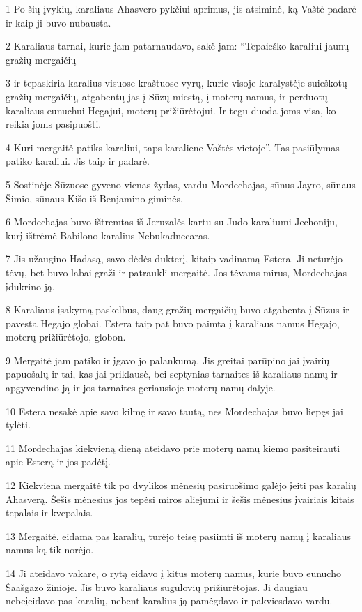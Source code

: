 \par 1 Po šių įvykių, karaliaus Ahasvero pykčiui aprimus, jis atsiminė, ką Vaštė padarė ir kaip ji buvo nubausta. 
\par 2 Karaliaus tarnai, kurie jam patarnaudavo, sakė jam: “Tepaieško karaliui jaunų gražių mergaičių 
\par 3 ir tepaskiria karalius visuose kraštuose vyrų, kurie visoje karalystėje suieškotų gražių mergaičių, atgabentų jas į Sūzų miestą, į moterų namus, ir perduotų karaliaus eunuchui Hegajui, moterų prižiūrėtojui. Ir tegu duoda joms visa, ko reikia joms pasipuošti. 
\par 4 Kuri mergaitė patiks karaliui, taps karaliene Vaštės vietoje”. Tas pasiūlymas patiko karaliui. Jis taip ir padarė. 
\par 5 Sostinėje Sūzuose gyveno vienas žydas, vardu Mordechajas, sūnus Jayro, sūnaus Šimio, sūnaus Kišo iš Benjamino giminės. 
\par 6 Mordechajas buvo ištremtas iš Jeruzalės kartu su Judo karaliumi Jechoniju, kurį ištrėmė Babilono karalius Nebukadnecaras. 
\par 7 Jis užaugino Hadasą, savo dėdės dukterį, kitaip vadinamą Estera. Ji neturėjo tėvų, bet buvo labai graži ir patraukli mergaitė. Jos tėvams mirus, Mordechajas įdukrino ją. 
\par 8 Karaliaus įsakymą paskelbus, daug gražių mergaičių buvo atgabenta į Sūzus ir pavesta Hegajo globai. Estera taip pat buvo paimta į karaliaus namus Hegajo, moterų prižiūrėtojo, globon. 
\par 9 Mergaitė jam patiko ir įgavo jo palankumą. Jis greitai parūpino jai įvairių papuošalų ir tai, kas jai priklausė, bei septynias tarnaites iš karaliaus namų ir apgyvendino ją ir jos tarnaites geriausioje moterų namų dalyje. 
\par 10 Estera nesakė apie savo kilmę ir savo tautą, nes Mordechajas buvo liepęs jai tylėti. 
\par 11 Mordechajas kiekvieną dieną ateidavo prie moterų namų kiemo pasiteirauti apie Esterą ir jos padėtį. 
\par 12 Kiekviena mergaitė tik po dvylikos mėnesių pasiruošimo galėjo įeiti pas karalių Ahasverą. Šešis mėnesius jos tepėsi miros aliejumi ir šešis mėnesius įvairiais kitais tepalais ir kvepalais. 
\par 13 Mergaitė, eidama pas karalių, turėjo teisę pasiimti iš moterų namų į karaliaus namus ką tik norėjo. 
\par 14 Ji ateidavo vakare, o rytą eidavo į kitus moterų namus, kurie buvo eunucho Šaašgazo žinioje. Jis buvo karaliaus sugulovių prižiūrėtojas. Ji daugiau nebeįeidavo pas karalių, nebent karalius ją pamėgdavo ir pakviesdavo vardu. 
